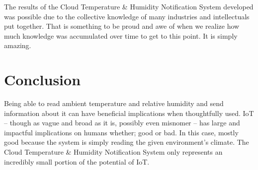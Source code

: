 \documentclass{article}
\begin{document}
The results of the Cloud Temperature \& Humidity Notification System developed was possible due to the collective knowledge of many industries and intellectuals put together. That is something to be proud and awe of when we realize how much knowledge was accumulated over time to get to this point. It is simply amazing.

\section{Conclusion}
Being able to read ambient temperature and relative humidity and send information about it can have beneficial implications when thoughtfully used. IoT -- though as vague and broad as it is, possibly even misnomer -- has large and impactful implications on humans whether; good or bad. In this case, mostly good because the system is simply reading the given environment's climate. The Cloud Temperature \& Humidity Notification System only represents an incredibly small portion of the potential of IoT.
\end{document}
